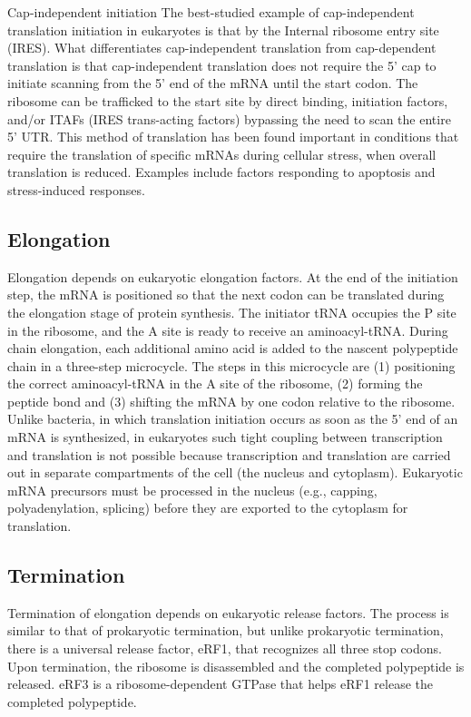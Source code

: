 Cap-independent initiation
The best-studied example of cap-independent translation initiation in eukaryotes is that by the Internal ribosome entry site (IRES). What differentiates cap-independent translation from cap-dependent translation is that cap-independent translation does not require the 5' cap to initiate scanning from the 5' end of the mRNA until the start codon. The ribosome can be trafficked to the start site by direct binding, initiation factors, and/or ITAFs (IRES trans-acting factors) bypassing the need to scan the entire 5' UTR. This method of translation has been found important in conditions that require the translation of specific mRNAs during cellular stress, when overall translation is reduced. Examples include factors responding to apoptosis and stress-induced responses.

\hypertarget{elongation-2}{%
\subsection{Elongation}\label{elongation-2}}

Elongation depends on eukaryotic elongation factors. At the end of the initiation step, the mRNA is positioned so that the next codon can be translated during the elongation stage of protein synthesis. The initiator tRNA occupies the P site in the ribosome, and the A site is ready to receive an aminoacyl-tRNA. During chain elongation, each additional amino acid is added to the nascent polypeptide chain in a three-step microcycle. The steps in this microcycle are (1) positioning the correct aminoacyl-tRNA in the A site of the ribosome, (2) forming the peptide bond and (3) shifting the mRNA by one codon relative to the ribosome. Unlike bacteria, in which translation initiation occurs as soon as the 5' end of an mRNA is synthesized, in eukaryotes such tight coupling between transcription and translation is not possible because transcription and translation are carried out in separate compartments of the cell (the nucleus and cytoplasm). Eukaryotic mRNA precursors must be processed in the nucleus (e.g., capping, polyadenylation, splicing) before they are exported to the cytoplasm for translation.

\hypertarget{termination-2}{%
\subsection{Termination}\label{termination-2}}

Termination of elongation depends on eukaryotic release factors. The process is similar to that of prokaryotic termination, but unlike prokaryotic termination, there is a universal release factor, eRF1, that recognizes all three stop codons. Upon termination, the ribosome is disassembled and the completed polypeptide is released. eRF3 is a ribosome-dependent GTPase that helps eRF1 release the completed polypeptide.

